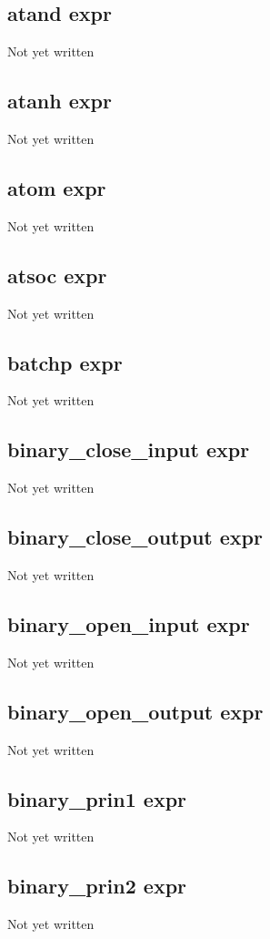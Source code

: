 \documentclass[a4paper,11pt]{article}
\begin{document}
{\subsection{\ttfamily atand expr}
Not yet written

\subsection{\ttfamily atanh expr}
Not yet written

\subsection{\ttfamily atom expr}
Not yet written

\subsection{\ttfamily atsoc expr}
Not yet written

\subsection{\ttfamily batchp expr}
Not yet written

\subsection{\ttfamily binary\_close\_input expr}
Not yet written

\subsection{\ttfamily binary\_close\_output expr}
Not yet written

\subsection{\ttfamily binary\_open\_input expr}
Not yet written

\subsection{\ttfamily binary\_open\_output expr}
Not yet written

\subsection{\ttfamily binary\_prin1 expr}
Not yet written

\subsection{\ttfamily binary\_prin2 expr}
Not yet written

}
\end{document}
